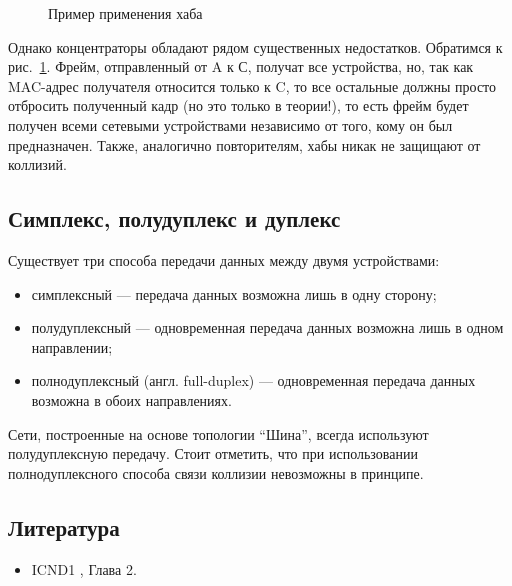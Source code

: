 \begin{figure}[h!]
	\caption{Пример применения хаба}
	\label{fig:hub}
\end{figure}

Однако концентраторы обладают рядом существенных недостатков. Обратимся к рис.~\ref{fig:hub}. Фрейм, отправленный от A к С, получат все устройства, но, так как MAC-адрес получателя относится только к C, то все остальные должны просто отбросить полученный кадр (но это только в теории!), то есть фрейм будет получен всеми сетевыми устройствами независимо от того, кому он был предназначен. Также, аналогично повторителям, хабы никак не защищают от коллизий.
\subsection{Симплекс, полудуплекс и дуплекс}
Существует три способа передачи данных между двумя устройствами:
\begin{itemize}
	\item симплексный --- передача данных возможна лишь в одну сторону;
	\item полудуплексный --- одновременная передача данных возможна лишь в одном направлении;
	\item полнодуплексный (англ. full-duplex) --- одновременная передача данных возможна в обоих направлениях.
\end{itemize}
Сети, построенные на основе топологии \enquote{Шина}, всегда используют полудуплексную передачу. Стоит отметить, что при использовании полнодуплексного способа связи коллизии невозможны в принципе.
\subsection{Литература}
\begin{itemize}
	\item ICND1 \cite{icnd1eng}, Глава 2.
\end{itemize}